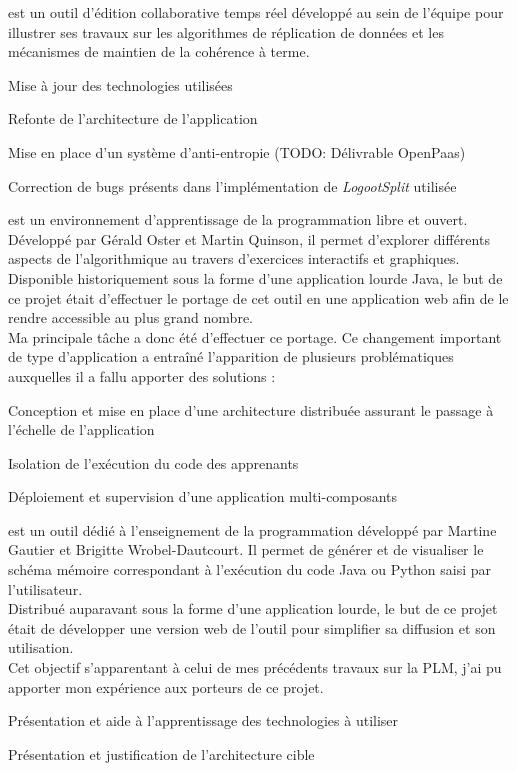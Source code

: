\documentclass[]{deedy-resume-openfont}
\begin{document}
\href{https://www.coedit.re}{} est un outil d'édition collaborative temps réel développé au sein de l'équipe
pour illustrer ses travaux sur les algorithmes de réplication de données et les mécanismes de maintien de la cohérence à terme.
\begin{tightemize}
\item Mise à jour des technologies utilisées
\item Refonte de l'architecture de l'application
\item Mise en place d'un système d'anti-entropie (TODO: Délivrable OpenPaas)
\item Correction de bugs présents dans l'implémentation de \emph{LogootSplit} utilisée
\end{tightemize}
\sectionsep

\href{http://people.irisa.fr/Martin.Quinson/Teaching/PLM/}{} est un environnement d’apprentissage de la programmation libre et ouvert.
Développé par Gérald Oster et Martin Quinson, il permet d’explorer différents aspects de l’algorithmique au travers d’exercices interactifs et graphiques.
\\
Disponible historiquement sous la forme d'une application lourde Java, le but de ce projet était d'effectuer le portage de cet outil en une application web
afin de le rendre accessible au plus grand nombre.
\\
Ma principale tâche a donc été d'effectuer ce portage.
Ce changement important de type d'application a entraîné l'apparition de plusieurs problématiques auxquelles il a fallu apporter des solutions :
\begin{tightemize}
\item Conception et mise en place d'une architecture distribuée assurant le passage à l'échelle de l'application
\item Isolation de l'exécution du code des apprenants
\item Déploiement et supervision d'une application multi-composants
\end{tightemize}
\sectionsep

\href{http://arteoz.loria.fr/}{} est un outil dédié à l'enseignement de la programmation développé par Martine Gautier et Brigitte Wrobel-Dautcourt.
Il permet de générer et de visualiser le schéma mémoire correspondant à l'exécution du code Java ou Python saisi par l'utilisateur.
\\
Distribué auparavant sous la forme d'une application lourde, le but de ce projet était de développer une version web de l'outil pour simplifier sa diffusion et son utilisation.
\\
Cet objectif s'apparentant à celui de mes précédents travaux sur la PLM, j'ai pu apporter mon expérience aux porteurs de ce projet.
\begin{tightemize}
\item Présentation et aide à l'apprentissage des technologies à utiliser
\item Présentation et justification de l'architecture cible
\end{tightemize}
\sectionsep
\end{document}
